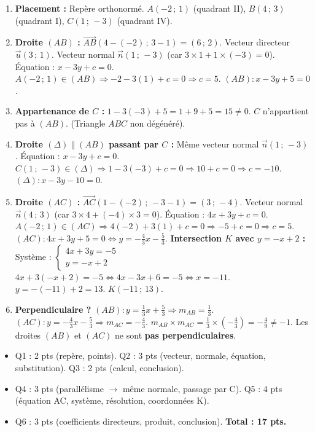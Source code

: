 \documentclass[11pt]{article}
\begin{document}
\begin{corrige}
\begin{enumerate}
\item \textbf{Placement :} Repère orthonormé. $A(-2\,;\,1)$ (quadrant II), $B(4\,;\,3)$ (quadrant I), $C(1\,;\,-3)$ (quadrant IV).
\item \textbf{Droite $(AB)$ :} $\overrightarrow{AB}(4-(-2)\,;\,3-1) = (6\,;\,2)$. Vecteur directeur $\vec{u}(3\,;\,1)$.
Vecteur normal $\vec{n}(1\,;\,-3)$ (car $3\times1+1\times(-3)=0$).
Équation : $x - 3y + c = 0$. $A(-2\,;\,1) \in (AB) \Rightarrow -2 - 3(1) + c = 0 \Rightarrow c = 5$.
$\boxed{(AB) : x - 3y + 5 = 0}$.
\item \textbf{Appartenance de $C$ :} $1 - 3(-3) + 5 = 1 + 9 + 5 = 15 \neq 0$.
$C$ n'appartient pas à $(AB)$. (Triangle $ABC$ non dégénéré).
\item \textbf{Droite $(\Delta) \parallel (AB)$ passant par $C$ :} Même vecteur normal $\vec{n}(1\,;\,-3)$.
Équation : $x - 3y + c = 0$. $C(1\,;\,-3) \in (\Delta) \Rightarrow 1 - 3(-3) + c = 0 \Rightarrow 10 + c = 0 \Rightarrow c = -10$.
$\boxed{(\Delta) : x - 3y - 10 = 0}$.
\item \textbf{Droite $(AC)$ :} $\overrightarrow{AC}(1-(-2)\,;\,-3-1) = (3\,;\,-4)$.
Vecteur normal $\vec{n}(4\,;\,3)$ (car $3\times4 + (-4)\times3 = 0$).
Équation : $4x + 3y + c = 0$. $A(-2\,;\,1) \in (AC) \Rightarrow 4(-2) + 3(1) + c = 0 \Rightarrow -5 + c = 0 \Rightarrow c = 5$.
$(AC) : 4x + 3y + 5 = 0 \iff y = -\frac{4}{3}x - \frac{5}{3}$.
\textbf{Intersection $K$ avec $y = -x + 2$ :}
Système : $\begin{cases} 4x + 3y = -5 \\ y = -x + 2 \end{cases}$
$4x + 3(-x+2) = -5 \iff 4x - 3x + 6 = -5 \iff x = -11$.
$y = -(-11) + 2 = 13$.
$\boxed{K(-11\,;\,13)}$.
\item \textbf{Perpendiculaire ?}
$(AB) : y = \frac{1}{3}x + \frac{5}{3} \Rightarrow m_{AB} = \frac{1}{3}$.
$(AC) : y = -\frac{4}{3}x - \frac{5}{3} \Rightarrow m_{AC} = -\frac{4}{3}$.
$m_{AB} \times m_{AC} = \frac{1}{3} \times \left(-\frac{4}{3}\right) = -\frac{4}{9} \neq -1$.
Les droites $(AB)$ et $(AC)$ ne sont \textbf{pas perpendiculaires}.
\end{enumerate}
\end{corrige}
\begin{aretenir}
\begin{itemize}
\item Q1 : 2 pts (repère, points). Q2 : 3 pts (vecteur, normale, équation, substitution). Q3 : 2 pts (calcul, conclusion).
\item Q4 : 3 pts (parallélisme $\rightarrow$ même normale, passage par C). Q5 : 4 pts (équation AC, système, résolution, coordonnées K).
\item Q6 : 3 pts (coefficients directeurs, produit, conclusion).
\textbf{Total : 17 pts.}
\end{itemize}
\end{aretenir}
\end{document}

